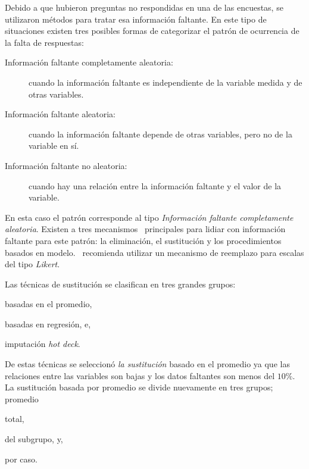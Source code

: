 Debido a que hubieron preguntas no respondidas en una de las encuestas, se utilizaron 
métodos para tratar esa información faltante. En este tipo de situaciones existen tres 
posibles formas de categorizar el patrón de ocurrencia de la falta de 
respuestas\cite{leite2010performance, tsikriktsis2005review}:

\begin{description}
    \item[Información faltante completamente aleatoria:] cuando la información
        faltante es independiente de la variable medida y de otras variables.
    \item[Información faltante aleatoria:] cuando la información faltante depende
        de otras variables, pero no de la variable en sí. 
    \item[Información faltante no aleatoria:] cuando hay una relación entre la
        información faltante y el valor de la variable.
\end{description}

En esta caso el patrón corresponde al tipo \emph{Información faltante completamente aleatoria}. 
Existen a tres mecanismos~\cite{tsikriktsis2005review} principales para lidiar con información
faltante para este patrón: la eliminación, el sustitución y los  procedimientos basados en
modelo.~\cite{tsikriktsis2005review} recomienda utilizar un mecanismo de
reemplazo para escalas del tipo \textit{Likert}.

Las técnicas de sustitución se clasifican en tres grandes
grupos\cite{tsikriktsis2005review}:
\begin{enumerate*}[label=\itshape\alph*\upshape)]
\item basadas en el promedio,
\item basadas en regresión, e,
\item imputación \emph{hot deck}.
\end{enumerate*}

De estas técnicas se seleccionó \emph{la sustitución} basado en el 
promedio ya que las relaciones entre las variables son bajas y los datos
faltantes son menos del $10\%$. La sustitución basada por promedio se divide
nuevamente en tres grupos\cite{tsikriktsis2005review}; promedio
\begin{enumerate*}[label=\itshape\alph*\upshape.]
\item total,
\item del subgrupo, y,
\item por caso.
\end{enumerate*}

